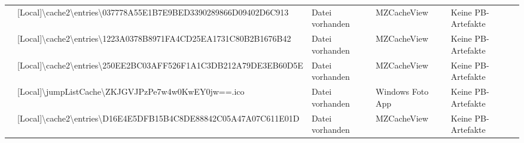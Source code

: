 \begin{appendices}
{\begin{landscape}
\begin{table}[h!]
{\begin{tabular}{cllll}
	\multicolumn{1}{|c|}{}                                                                                       & \multicolumn{1}{l|}{\cellcolor[HTML]{34CDF9}[Local]\textbackslash{}cache2\textbackslash{}entries\textbackslash{}037778A55E1B7E9BED3390289866D09402D6C913}                                                                  & \multicolumn{1}{l|}{\cellcolor[HTML]{009901}Datei vorhanden}                                      & \multicolumn{1}{l|}{MZCacheView}            & \multicolumn{1}{l|}{\cellcolor[HTML]{F8A102}Keine PB-Artefakte} \\ \cline{2-5} 
	\multicolumn{1}{|c|}{}                                                                                       & \multicolumn{1}{l|}{\cellcolor[HTML]{34CDF9}[Local]\textbackslash{}cache2\textbackslash{}entries\textbackslash{}1223A0378B8971FA4CD25EA1731C80B2B1676B42}                                                                  & \multicolumn{1}{l|}{\cellcolor[HTML]{009901}Datei vorhanden}                                      & \multicolumn{1}{l|}{MZCacheView}            & \multicolumn{1}{l|}{\cellcolor[HTML]{F8A102}Keine PB-Artefakte} \\ \cline{2-5} 
	\multicolumn{1}{|c|}{}                                                                                       & \multicolumn{1}{l|}{\cellcolor[HTML]{34CDF9}[Local]\textbackslash{}cache2\textbackslash{}entries\textbackslash{}250EE2BC03AFF526F1A1C3DB212A79DE3EB60D5E}                                                                  & \multicolumn{1}{l|}{\cellcolor[HTML]{009901}Datei vorhanden}                                      & \multicolumn{1}{l|}{MZCacheView}            & \multicolumn{1}{l|}{\cellcolor[HTML]{F8A102}Keine PB-Artefakte} \\ \cline{2-5} 
	\multicolumn{1}{|c|}{}                                                                                       & \multicolumn{1}{l|}{\cellcolor[HTML]{34CDF9}[Local]\textbackslash{}jumpListCache\textbackslash{}ZKJGVJPzPe7w4w0KwEY0jw==.ico}                                                                                              & \multicolumn{1}{l|}{\cellcolor[HTML]{009901}Datei vorhanden}                                      & \multicolumn{1}{l|}{Windows Foto App}            & \multicolumn{1}{l|}{\cellcolor[HTML]{F8A102}Keine PB-Artefakte} \\ \cline{2-5} 
	\multicolumn{1}{|c|}{}                                                                                       & \multicolumn{1}{l|}{\cellcolor[HTML]{34CDF9}[Local]\textbackslash{}cache2\textbackslash{}entries\textbackslash{}D16E4E5DFB15B4C8DE88842C05A47A07C611E01D}                                                                  & \multicolumn{1}{l|}{\cellcolor[HTML]{009901}Datei vorhanden}                                      & \multicolumn{1}{l|}{MZCacheView}            & \multicolumn{1}{l|}{\cellcolor[HTML]{F8A102}Keine PB-Artefakte} \\ \cline{2-5} 

\end{tabular}}
\end{table}
\end{landscape}}
\end{appendices}
